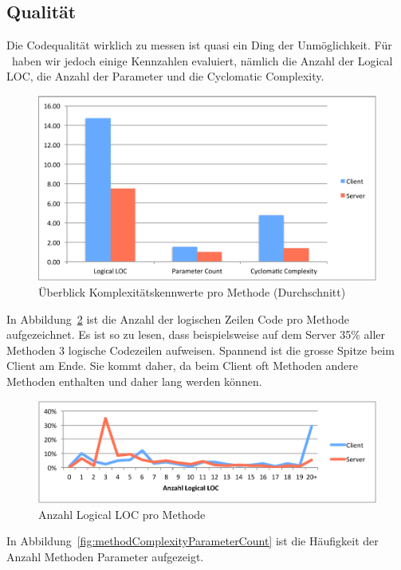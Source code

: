 	\subsection{Qualität}
	Die Codequalität wirklich zu messen ist quasi ein Ding der Unmöglichkeit.
	Für \eeppi\ haben wir jedoch einige Kennzahlen evaluiert,
	nämlich die Anzahl der Logical LOC, die Anzahl der Parameter und die Cyclomatic Complexity.
	\begin{figure}[H]
		\includegraphics[width=\textwidth]{qualityManagement/media/img/methodComplexityOverview.pdf}
		\centering
		\caption{Überblick Komplexitätskennwerte pro Methode (Durchschnitt)}
		\label{fig:methodComplexityOverview}
	\end{figure}
	In Abbildung\ \ref{fig:methodComplexityLLOC} ist die Anzahl der logischen Zeilen Code pro Methode aufgezeichnet.
	Es ist so zu lesen, dass beispielsweise auf dem Server 35\% aller Methoden 3 logische Codezeilen aufweisen.
	Spannend ist die grosse Spitze beim Client am Ende.
	Sie kommt daher, da beim Client oft Methoden andere Methoden enthalten und daher lang werden können.
	\begin{figure}[H]
		\includegraphics[width=\textwidth]{qualityManagement/media/img/methodComplexityLLOC.pdf}
		\centering
		\caption{Anzahl Logical LOC pro Methode}
		\label{fig:methodComplexityLLOC}
	\end{figure}
	In Abbildung\ \ref{fig:methodComplexityParameterCount} ist die Häufigkeit der Anzahl Methoden Parameter aufgezeigt.
